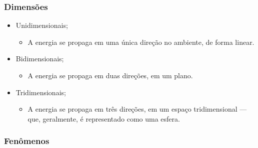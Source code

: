\documentclass[
  a4paper]{article}
\providecommand{\tightlist}{%
  \setlength{\itemsep}{0pt}\setlength{\parskip}{0pt}}
\begin{document}
\hypertarget{dimensuxf5es}{%
\subsubsection{Dimensões}\label{dimensuxf5es}}

\begin{itemize}
\tightlist
\item
  Unidimensionais;

  \begin{itemize}
  \tightlist
  \item
    A energia se propaga em uma única direção no ambiente, de forma
    linear.
  \end{itemize}
\item
  Bidimensionais;

  \begin{itemize}
  \tightlist
  \item
    A energia se propaga em duas direções, em um plano.
  \end{itemize}
\item
  Tridimensionais;

  \begin{itemize}
  \tightlist
  \item
    A energia se propaga em três direções, em um espaço tridimensional
    --- que, geralmente, é representado como uma esfera.
  \end{itemize}
\end{itemize}

\hypertarget{fenuxf4menos}{%
\subsubsection{Fenômenos}\label{fenuxf4menos}}
\end{document}

